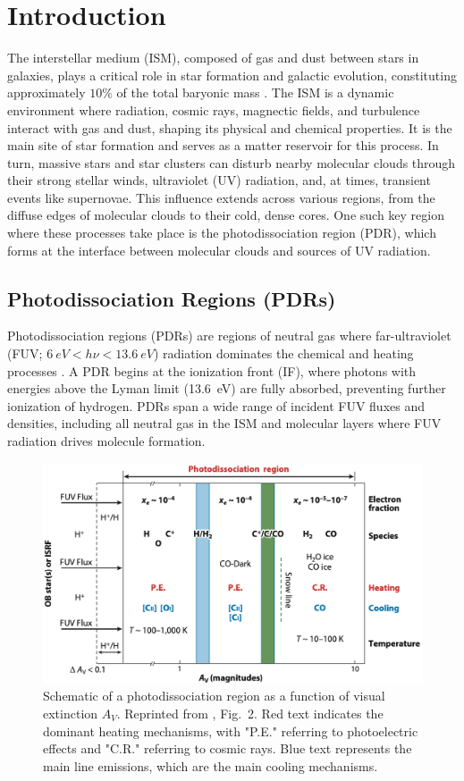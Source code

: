 \documentclass[12pt,a4paper]{article}
\begin{document}
\clearpage
{}
\section{Introduction}

The interstellar medium (ISM), composed of gas and dust between stars in galaxies, plays a critical role in star formation and galactic evolution, constituting approximately $10\%$ of the total baryonic mass \parencite{Draine2011}. The ISM is a dynamic environment where radiation, cosmic rays, magnectic fields, and turbulence interact with gas and dust, shaping its physical and chemical properties. It is the main site of star formation and serves as a matter reservoir for this process. In turn, massive stars and star clusters can disturb nearby molecular clouds through their strong stellar winds, ultraviolet (UV) radiation, and, at times, transient events like supernovae. This influence extends across various regions, from the diffuse edges of molecular clouds to their cold, dense cores. One such key region where these processes take place is the photodissociation region (PDR), which forms at the interface between molecular clouds and sources of UV radiation. 

\subsection{Photodissociation Regions (PDRs)}
Photodissociation regions (PDRs) are regions of neutral gas where far-ultraviolet (FUV; $\qty{6}{eV} < h\nu < \qty{13.6}{eV}$) radiation dominates the chemical and heating processes \parencite{Tielens1985}. A PDR begins at the ionization front (IF), where photons with energies above the Lyman limit (\qty{13.6}{eV}) are fully absorbed, preventing further ionization of hydrogen. PDRs span a wide range of incident FUV fluxes and densities, including all neutral gas in the ISM and molecular layers where FUV radiation drives molecule formation.

\begin{figure}[hb]
    \centering
    \includegraphics[width=.7\textwidth,keepaspectratio]{figures/PDRScheme.png}
    \caption{Schematic of a photodissociation region as a function of visual extinction $A_V$. Reprinted from \textcite{Wolfire2022}, Fig.~2. Red text indicates the dominant heating mechanisms, with "P.E." referring to photoelectric effects and "C.R." referring to cosmic rays. Blue text represents the main line emissions, which are the main cooling mechanisms.} \label{fig:pdrscheme}
\end{figure}
\end{document}
